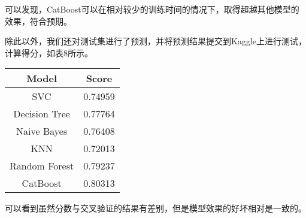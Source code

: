 \documentclass[../main.tex]{subfiles}
\begin{document}
        可以发现，CatBoost可以在相对较少的训练时间的情况下，取得超越其他模型的效果，符合预期。

        除此以外，我们还对测试集进行了预测，并将预测结果提交到Kaggle上进行测试，计算得分，如表8所示。

        \begin{table}[H]
            \footnotesize
            \centering
            \begin{tabular}{|c|c|}
            \hline
            \textbf{Model} & \textbf{Score} \\ \hline
            SVC            & 0.74959        \\ \hline
            Decision Tree  & 0.77764        \\ \hline
            Naive Bayes    & 0.76408        \\ \hline
            KNN            & 0.72013        \\ \hline
            Random Forest  & 0.79237        \\ \hline
            CatBoost       & 0.80313        \\ \hline
            \end{tabular}
        \end{table}

        可以看到虽然分数与交叉验证的结果有差别，但是模型效果的好坏相对是一致的。
\end{document}
